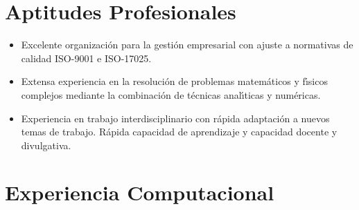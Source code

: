 \documentclass{article}
\begin{document}


\section*{Aptitudes Profesionales}

\begin{itemize}\itemsep 0pt
\item Excelente organizaci\'on para la gesti\'on empresarial con ajuste a normativas de calidad ISO-9001 e ISO-17025.

\item Extensa experiencia en la resoluci\'{o}n de pro\-ble\-mas 
matem\'{a}ticos y f\'{\i}sicos complejos mediante la combinaci\'{o}n 
de t\'{e}cnicas anal\'{\i}ticas y num\'{e}ricas.

\item Experiencia en trabajo interdisciplinario con r\'{a}pida 
adaptaci\'{o}n a nuevos temas de trabajo. R\'{a}pida capacidad de aprendizaje y capacidad docente y divulgativa.
\end{itemize}


\section*{Experiencia Computacional}
\end{document}
